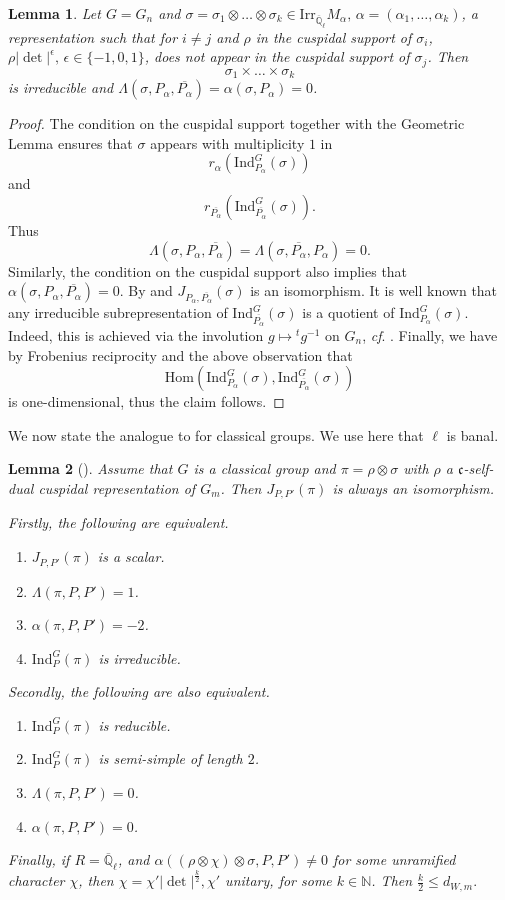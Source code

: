 \documentclass[10pt,a4paper]{article}
\newtheorem{lemma}{Lemma}
\theoremstyle{remark}
\theoremstyle{definition}
\newcommand{\ql}{{\overline{\mathbb{Q}}_\ell}}
\newcommand{\ip}{\mathrm{Ind}_P^G}
\newcommand{\ho}{\mathrm{Hom}}
\newcommand{\id}{\mathrm{Ind}}
\newcommand{\ji}{J_{P,P'}}
\newcommand{\NN}{\mathbb{N}}
\newcommand{\irr}{\mathrm{Irr}}
\newcommand{\fc}{\mathfrak{c}}
\begin{document}
\begin{lemma}\label{L:shiftgl}
    Let $G=G_n$ and $\sigma=\sigma_1\otimes\ldots\otimes\sigma_k\in\irr_\ql M_\alpha,\,\alpha=(\alpha_1,\ldots,\alpha_k)$, a representation such that for $i\neq j$ and $\rho$ in the cuspidal support of $\sigma_i$, $\rho\lvert\det\rvert^\epsilon,\,\epsilon\in\{-1,0,1\}$, does not appear in the cuspidal support of $\sigma_j$. Then
    \[\sigma_1\times\ldots\times\sigma_k\]
    is irreducible and $\Lambda(\sigma,P_\alpha,\overline{P_\alpha})=\alpha(\sigma,P_\alpha)=0$.
\end{lemma}
\begin{proof}
    The condition on the cuspidal support together with the Geometric Lemma ensures that $\sigma$ appears with multiplicity $1$ in \[r_\alpha(\id_{P_\alpha}^G(\sigma))\] and \[r_{\overline{P_\alpha}}(\id_{\overline{P_\alpha}}^G(\sigma)).\] Thus \[\Lambda(\sigma,P_\alpha,\overline{P_\alpha})=\Lambda(\sigma,\overline{P_\alpha},P_\alpha)=0.\] Similarly, the condition on the cuspidal support also implies that $\alpha(\sigma,P_\alpha,\overline{P_\alpha})=0$. By  and  $J_{P_\alpha,\overline{P_\alpha}}(\sigma)$ is an isomorphism. It is well known that any irreducible subrepresentation of $\id_{\overline{P_\alpha}}^G(\sigma)$ is a quotient of $\id_{P_\alpha}^G(\sigma)$. Indeed, this is achieved via the involution $g\mapsto{}^tg^{-1}$ on $G_n$, \emph{cf}. \cite{Vig96}.
    Finally, we have by Frobenius reciprocity and the above observation that
\[\ho(\id_{P_\alpha}^G(\sigma),\id_{\overline{P_\alpha}}^G(\sigma))\]
    is one-dimensional, thus the claim follows.
\end{proof}
We now state the analogue to  for classical groups. We use here that $\ell$ is banal.
\begin{lemma}[{\cite[Proposition 8.4]{Dat05}}]\label{P:polesG}
    Assume that $G$ is a classical group and $\pi=\rho\otimes\sigma$ with $\rho$ a $\fc$-self-dual cuspidal representation of $G_m$.
    Then $\ji(\pi)$ is always an isomorphism.
    
    Firstly, the following are equivalent.
    \begin{enumerate}
        \item $\ji(\pi)$ is a scalar.
        \item $\Lambda(\pi,P,P')=1$.
        \item $\alpha(\pi,P,P')=-2$.
        \item $\ip(\pi)$ is irreducible.
    \end{enumerate}
    Secondly, the following are also equivalent.
    \begin{enumerate}
        \item $\ip(\pi)$ is reducible.
        \item $\ip(\pi)$ is semi-simple of length $2$.
        \item $\Lambda(\pi,P,P')=0$.
        \item $\alpha(\pi,P,P')=0$.
    \end{enumerate}
Finally, if $R=\ql$, and $\alpha((\rho\otimes \chi)\otimes\sigma,P,P')\neq 0$ for some unramified character $\chi$, then
$\chi=\chi'\lvert\det\rvert^{\frac{k}{2}}, \chi'$ unitary, for some $k\in \NN$. 
Then $\frac{k}{2}\le d_{W,m}.$
\end{lemma}
\end{document}
